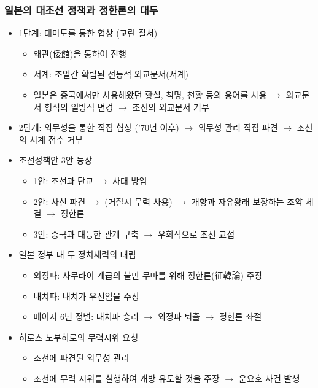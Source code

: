 \subsubsection*{일본의 대조선 정책과 정한론의 대두}
\begin{itemize}
    \item 1단계: 대마도를 통한 협상 (교린 질서)
    \begin{itemize}
        \item 왜관(倭館)을 통하여 진행
        \item 서계: 조일간 확립된 전통적 외교문서(서계)
        \item 일본은 중국에서만 사용해왔던 황실, 칙명, 천황 등의 용어를 사용 $\rightarrow$ 외교문서 형식의 일방적 변경 $\rightarrow$ 조선의 외교문서 거부
    \end{itemize}
    \item 2단계: 외무성을 통한 직접 협상 ('70년 이후) $\rightarrow$ 외무성 관리 직접 파견 $\rightarrow$ 조선의 서계 접수 거부
    \item 조선정책안 3안 등장
    \begin{itemize}
        \item 1안: 조선과 단교 $\rightarrow$ 사태 방임
        \item 2안: 사신 파견 $\rightarrow$ (거절시 무력 사용) $\rightarrow$ 개항과 자유왕래 보장하는 조약 체결 $\rightarrow$ 정한론
        \item 3안: 중국과 대등한 관계 구축 $\rightarrow$ 우회적으로 조선 교섭
    \end{itemize}
    \item 일본 정부 내 두 정치세력의 대립
    \begin{itemize}
        \item 외정파: 사무라이 계급의 불만 무마를 위해 정한론(征韓論) 주장
        \item 내치파: 내치가 우선임을 주장
        \item 메이지 6년 정변: 내치파 승리 $\rightarrow$ 외정파 퇴출 $\rightarrow$ 정한론 좌절
    \end{itemize}
    \item 히로츠 노부히로의 무력시위 요청
    \begin{itemize}
        \item 조선에 파견된 외무성 관리
        \item 조선에 무력 시위를 실행하여 개방 유도할 것을 주장 $\rightarrow$ 운요호 사건 발생
    \end{itemize}
\end{itemize}

